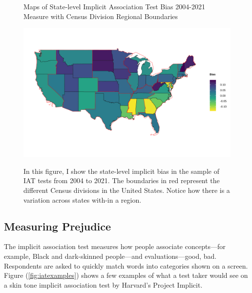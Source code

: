 \documentclass[12pt,english]{article}
\begin{document}
\newpage
\pagebreak

\begin{center}
\begin{figure}[H]
\caption{Maps of State-level Implicit Association Test Bias 2004-2021 Measure with Census Division Regional Boundaries}
\includegraphics[width=\textwidth]{figure/skinmap_all.png} 
\label{fig:iat-map-all}
\caption*{\footnotesize{In this figure, I show the state-level implicit bias in the sample of IAT tests from 2004 to 2021. The boundaries in red represent the different Census divisions in the United States. Notice how there is a variation across states with-in a region.}}
\end{figure}
\end{center}

\subsection{Measuring Prejudice}

The implicit association test measures how people associate concepts---for example, Black and dark-skinned people---and evaluations---good, bad. Respondents are asked to quickly match words into categories shown on a screen. Figure (\ref{fig:iatexamples}) shows a few examples of what a test taker would see on a skin tone implicit association test by Harvard's Project Implicit.
\end{document}
